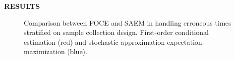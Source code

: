 \documentclass[final]{beamer}
\begin{document}
\begin{frame}[t]
\begin{columns}[t]
\begin{column}{0.6\paperwidth}
\begin{block}{\textbf{RESULTS}}
\begin{figure}
\caption{Comparison between FOCE and SAEM in handling erroneous times stratified on sample collection design. First-order conditional estimation (red) and stochastic approximation expectation-maximization (blue).}
\end{figure}
\end{block}

\end{column}

\end{columns}
\end{frame}
\end{document}
